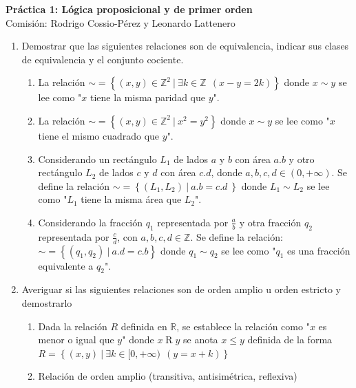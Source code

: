\documentclass[a4paper]{article}
\newcommand{\answer}{\item[**]}
\newcommand{\exercise}{\item}
\begin{document}
\noindent \hrulefill 
\vspace{-7pt}
\begin{center} 
	\textbf{ Práctica 1: Lógica proposicional y de primer orden } \\
	Comisión: Rodrigo Cossio-Pérez y Leonardo Lattenero
\end{center}
\vspace{-10pt}
\hrulefill


\begin{enumerate}

	\exercise Demostrar que las siguientes relaciones son de equivalencia, indicar sus clases de equivalencia y el conjunto cociente.
	\begin{enumerate} [label=(\alph*)]
		\item La relación $ \sim = \left\lbrace (x,y) \in \mathbb{Z}^{2} ~|~ \exists k \in \mathbb{Z} ~~(x-y=2k) \right\rbrace$ donde $x \sim y$ se lee como "$x$ tiene la misma paridad que $y$".
		
		\item La relación $ \sim = \left\lbrace (x,y)\in \mathbb{Z}^{2} ~|~ x^{2}=y^{2} \right\rbrace$ donde $x \sim y$ se lee como "$x$ tiene el mismo cuadrado que $y$".
		
		\item Considerando un rectángulo $L_{1}$ de lados $a$ y $b$ con área $a.b$ y otro rectángulo $L_2$ de lados $c$ y $d$ con área $c.d$, donde $a,b,c,d \in ( 0 , +\infty)$. Se define la relación $ \sim = \left\lbrace (L_1,L_2) ~|~ a.b=c.d ~\right\rbrace$ donde $L_{1}\sim L_{2}$ se lee como "$L_{1}$ tiene la misma área que $L_{2}$".
		
		\item Considerando la fracción $q_1$ representada por $\displaystyle\frac{a}{b}$ y otra fracción $q_2$ representada por $\displaystyle\frac{c}{d}$, con $a,b,c,d\in\mathbb{Z}$. Se define la relación: $\sim = \left\lbrace (q_1,q_2) ~|~ a.d=c.b \right\rbrace$ donde $q_{1}\sim q_{2}$ se lee como "$q_{1}$ es una fracción equivalente a $q_{2}$".

	\end{enumerate}


	\exercise Averiguar si las siguientes relaciones son de orden amplio u orden estricto y demostrarlo
	\begin{enumerate} [label=(\alph*)]
		\item Dada la relación $R$ definida en $\mathbb{R}$, se establece la relación como "$x$ es menor o igual que $y$" donde $x\mathrel{R}y$ se anota $x\leq y$ definida de la forma $R = \left\lbrace (x,y) ~|~ \exists k \in [0,+\infty) ~~( y=x+k ) \right\rbrace$
		\answer Relación de orden amplio (transitiva, antisimétrica, reflexiva) 


\end{enumerate}
\end{enumerate}
\end{document}
